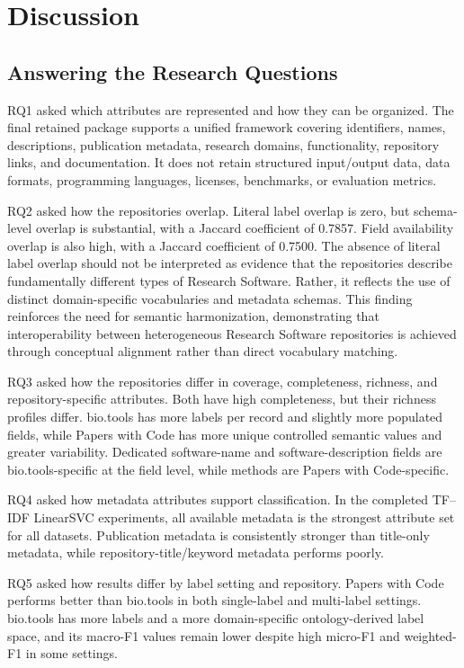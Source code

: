 \documentclass[pdflatex,sn-mathphys-num]{sn-jnl}%
\theoremstyle{thmstyleone}%
\theoremstyle{thmstyletwo}%
\theoremstyle{thmstylethree}%
\begin{document}
\section{Discussion}
\label{sec:discussion}

\subsection{Answering the Research Questions}
\label{subsec:discussion-rqs}

RQ1 asked which attributes are represented and how they can be organized. The final retained package supports a unified framework covering identifiers, names, descriptions, publication metadata, research domains, functionality, repository links, and documentation. It does not retain structured input/output data, data formats, programming languages, licenses, benchmarks, or evaluation metrics.

RQ2 asked how the repositories overlap. Literal label overlap is zero, but schema-level overlap is substantial, with a Jaccard coefficient of 0.7857. Field availability overlap is also high, with a Jaccard coefficient of 0.7500. The absence of literal label overlap should not be interpreted as evidence that the repositories describe fundamentally different types of Research Software. Rather, it reflects the use of distinct domain-specific vocabularies and metadata schemas. This finding reinforces the need for semantic harmonization, demonstrating that interoperability between heterogeneous Research Software repositories is achieved through conceptual alignment rather than direct vocabulary matching.

RQ3 asked how the repositories differ in coverage, completeness, richness, and repository-specific attributes. Both have high completeness, but their richness profiles differ. bio.tools has more labels per record and slightly more populated fields, while Papers with Code has more unique controlled semantic values and greater variability. Dedicated software-name and software-description fields are bio.tools-specific at the field level, while methods are Papers with Code-specific.

RQ4 asked how metadata attributes support classification. In the completed TF--IDF LinearSVC experiments, all available metadata is the strongest attribute set for all datasets. Publication metadata is consistently stronger than title-only metadata, while repository-title/keyword metadata performs poorly.

RQ5 asked how results differ by label setting and repository. Papers with Code performs better than bio.tools in both single-label and multi-label settings. bio.tools has more labels and a more domain-specific ontology-derived label space, and its macro-F1 values remain lower despite high micro-F1 and weighted-F1 in some settings.
\end{document}
